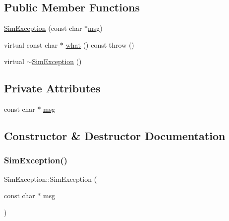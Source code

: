 \subsection*{Public Member Functions}
\begin{DoxyCompactItemize}
\item 
\hyperlink{class_sim_exception_a69f32113e1b068189e85f76b0340d073}{Sim\+Exception} (const char $\ast$\hyperlink{class_sim_exception_a1b07ee928b1ece4a807801a14713148a}{msg})
\item 
virtual const char $\ast$ \hyperlink{class_sim_exception_a7b759030340d1299a2eeb40c6f67a926}{what} () const  throw ()
\item 
virtual \hyperlink{class_sim_exception_a116fdf6821f150a43cefffd66d2b6506}{$\sim$\+Sim\+Exception} ()
\end{DoxyCompactItemize}
\subsection*{Private Attributes}
\begin{DoxyCompactItemize}
\item 
const char $\ast$ \hyperlink{class_sim_exception_a1b07ee928b1ece4a807801a14713148a}{msg}
\end{DoxyCompactItemize}


\subsection{Constructor \& Destructor Documentation}
\mbox{\label{class_sim_exception_a69f32113e1b068189e85f76b0340d073}} 
\subsubsection{\texorpdfstring{Sim\+Exception()}{SimException()}}
{\footnotesize\ttfamily Sim\+Exception\+::\+Sim\+Exception (\begin{DoxyParamCaption}\item[{const char $\ast$}]{msg }\end{DoxyParamCaption})}

\mbox{\label{class_sim_exception_a116fdf6821f150a43cefffd66d2b6506}} 
